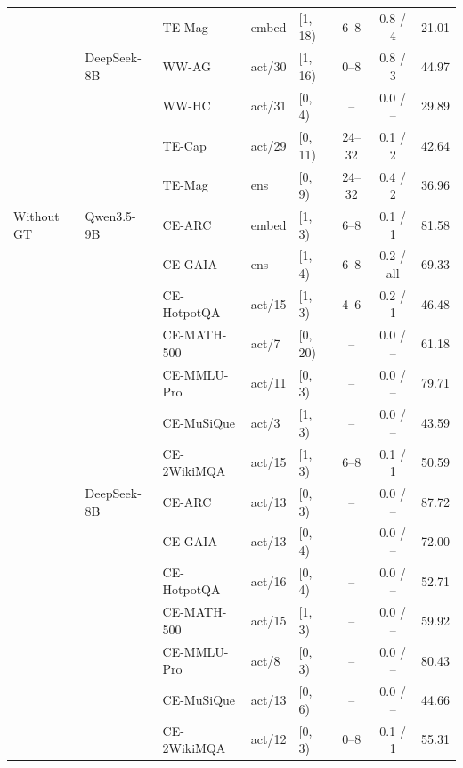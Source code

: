 \begin{table}[h]
\begin{tabular}{l l l l l c c r}
           &             & TE-Mag & embed  & [1, 18) & 6--8   & 0.8 / 4   & 21.01 \\
           & DeepSeek-8B & WW-AG  & act/30 & [1, 16) & 0--8   & 0.8 / 3   & 44.97 \\
           &             & WW-HC  & act/31 & [0, 4)  & --     & 0.0 / --  & 29.89 \\
           &             & TE-Cap & act/29 & [0, 11) & 24--32 & 0.1 / 2   & 42.64 \\
           &             & TE-Mag & ens    & [0, 9)  & 24--32 & 0.4 / 2   & 36.96 \\
\midrule
Without GT & Qwen3.5-9B  & CE-ARC      & embed  & [1, 3)  & 6--8 & 0.1 / 1   & 81.58 \\
           &             & CE-GAIA     & ens    & [1, 4)  & 6--8 & 0.2 / all & 69.33 \\
           &             & CE-HotpotQA & act/15 & [1, 3)  & 4--6 & 0.2 / 1   & 46.48 \\
           &             & CE-MATH-500 & act/7  & [0, 20) & --   & 0.0 / --  & 61.18 \\
           &             & CE-MMLU-Pro & act/11 & [0, 3)  & --   & 0.0 / --  & 79.71 \\
           &             & CE-MuSiQue  & act/3  & [1, 3)  & --   & 0.0 / --  & 43.59 \\
           &             & CE-2WikiMQA & act/15 & [1, 3)  & 6--8 & 0.1 / 1   & 50.59 \\
           & DeepSeek-8B & CE-ARC      & act/13 & [0, 3)  & --   & 0.0 / --  & 87.72 \\
           &             & CE-GAIA     & act/13 & [0, 4)  & --   & 0.0 / --  & 72.00 \\
           &             & CE-HotpotQA & act/16 & [0, 4)  & --   & 0.0 / --  & 52.71 \\
           &             & CE-MATH-500 & act/15 & [1, 3)  & --   & 0.0 / --  & 59.92 \\
           &             & CE-MMLU-Pro & act/8  & [0, 3)  & --   & 0.0 / --  & 80.43 \\
           &             & CE-MuSiQue  & act/13 & [0, 6)  & --   & 0.0 / --  & 44.66 \\
           &             & CE-2WikiMQA & act/12 & [0, 3)  & 0--8 & 0.1 / 1   & 55.31 \\
\bottomrule
\end{tabular}
\end{table}

